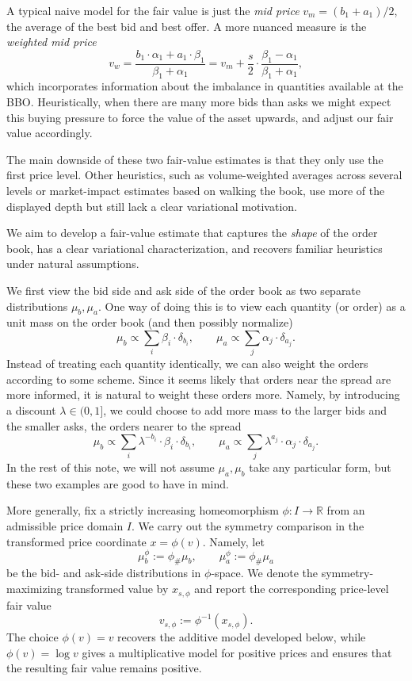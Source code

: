 A typical naive model for the fair value is just the \textit{mid price}
$v_{m} = (b_1 + a_1) / 2$, the average of the best bid and best offer.
 A more nuanced measure is the \textit{weighted mid price}
%
\[v_w = \frac{b_1 \cdot \alpha_1 + a_1 \cdot \beta_1}{\beta_1 + \alpha_1} = v_m + \frac{s}{2} \cdot \frac{\beta_1 - \alpha_1}{\beta_1 + \alpha_1},\]
%
which incorporates information about the imbalance in quantities available at the
 BBO. Heuristically, when there are many more bids than asks we might expect this
 buying pressure to force the value of the asset upwards, and adjust our
 fair value accordingly.

The main downside of these two fair-value estimates is that they only use the
first price level. Other heuristics, such as volume-weighted averages across
several levels or market-impact estimates based on walking the book, use more of
the displayed depth but still lack a clear variational motivation.

We aim to develop a fair-value estimate that captures the \textit{shape} of the
order book, has a clear variational characterization, and recovers familiar
heuristics under natural assumptions.

We first view the bid side and ask side of the order book as two separate
distributions $\mu_b, \mu_a$. One way of doing
this is to view each quantity (or order) as a unit mass on the order book
(and then possibly normalize)
%
\begin{equation}
    \mu_b \propto \sum_{i} \beta_i \cdot \delta_{b_i}, \qquad \mu_a \propto \sum_{j} \alpha_j \cdot \delta_{a_j}.
    \label{eqn:mua_mub_proportional}
\end{equation}
%
\noindent Instead of treating each quantity identically, we can also weight
 the orders according to some scheme. Since it seems likely that orders near the spread
 are more informed, it is natural to weight these orders more. Namely, by introducing a
 discount $\lambda \in (0,1]$, we could choose to add more mass to the larger bids and
 the smaller asks, the orders nearer to the spread
%
\begin{equation}
    \mu_b \propto \sum_{i} \lambda^{-b_i} \cdot \beta_i \cdot \delta_{b_i}, \qquad \mu_a \propto \sum_{j} \lambda^{a_j} \cdot \alpha_j \cdot \delta_{a_j}.
    \label{eqn:mua_mub}
\end{equation}
%
In the rest of this note, we will not assume $\mu_a, \mu_b$ take any
 particular form, but these two examples are good to have in mind.

More generally, fix a strictly increasing homeomorphism $\phi:I\to\mathbb R$ from
an admissible price domain $I$. We carry out the symmetry comparison in the
transformed price coordinate $x=\phi(v)$. Namely, let
%
\[\mu_b^\phi:=\phi_\#\mu_b, \qquad \mu_a^\phi:=\phi_\#\mu_a\]
%
\noindent be the bid- and ask-side distributions in $\phi$-space. We denote the
symmetry-maximizing transformed value by $x_{s,\phi}$ and report the corresponding
price-level fair value
%
\[v_{s,\phi}:=\phi^{-1}(x_{s,\phi}).\]
%
\noindent The choice $\phi(v)=v$ recovers the additive model developed below,
while $\phi(v)=\log v$ gives a multiplicative model for positive prices and
ensures that the resulting fair value remains positive.

